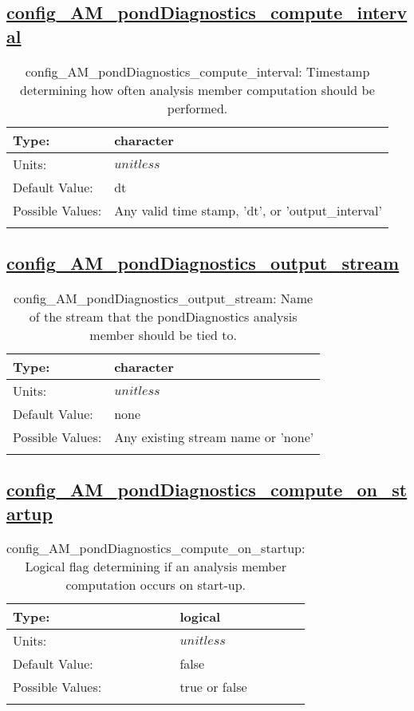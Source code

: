 \subsection[config\_AM\_pondDiagnostics\_compute\_interval]{\hyperref[sec:nm_tab_AM_pondDiagnostics]{config\_AM\_pondDiagnostics\_compute\_interval}}
\label{subsec:nm_sec_config_AM_pondDiagnostics_compute_interval}
\begin{center}
\begin{longtable}{| p{2.0in} || p{4.0in} |}
    \hline
    Type: & character \\
    \hline
    Units: & $unitless$ \\
    \hline
    Default Value: & dt \\
    \hline
    Possible Values: & Any valid time stamp, 'dt', or 'output\_interval' \\
    \hline
    \caption{config\_AM\_pondDiagnostics\_compute\_interval: Timestamp determining how often analysis member computation should be performed.}
\end{longtable}
\end{center}
\subsection[config\_AM\_pondDiagnostics\_output\_stream]{\hyperref[sec:nm_tab_AM_pondDiagnostics]{config\_AM\_pondDiagnostics\_output\_stream}}
\label{subsec:nm_sec_config_AM_pondDiagnostics_output_stream}
\begin{center}
\begin{longtable}{| p{2.0in} || p{4.0in} |}
    \hline
    Type: & character \\
    \hline
    Units: & $unitless$ \\
    \hline
    Default Value: & none \\
    \hline
    Possible Values: & Any existing stream name or 'none' \\
    \hline
    \caption{config\_AM\_pondDiagnostics\_output\_stream: Name of the stream that the pondDiagnostics analysis member should be tied to.}
\end{longtable}
\end{center}
\subsection[config\_AM\_pondDiagnostics\_compute\_on\_startup]{\hyperref[sec:nm_tab_AM_pondDiagnostics]{config\_AM\_pondDiagnostics\_compute\_on\_startup}}
\label{subsec:nm_sec_config_AM_pondDiagnostics_compute_on_startup}
\begin{center}
\begin{longtable}{| p{2.0in} || p{4.0in} |}
    \hline
    Type: & logical \\
    \hline
    Units: & $unitless$ \\
    \hline
    Default Value: & false \\
    \hline
    Possible Values: & true or false \\
    \hline
    \caption{config\_AM\_pondDiagnostics\_compute\_on\_startup: Logical flag determining if an analysis member computation occurs on start-up.}
\end{longtable}
\end{center}
